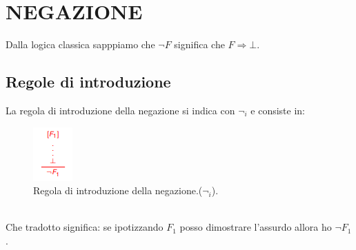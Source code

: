 \documentclass[12pt]{article}
\begin{document}
\section{NEGAZIONE}
\label{sec:neg}
Dalla logica classica sapppiamo che $ \neg F $ significa che $F \Rightarrow \bot $.

\pagebreak
\subsection{Regole di introduzione}
\label{ssec:neg_intro}
La regola di introduzione della negazione si indica con $\neg_i$ e consiste in:
\begin{figure}[!htb]
    \centering
    \includegraphics[width=.9\linewidth,height=.2\textheight,keepaspectratio]{logica_proposizionale/introduzione/introduzione_not.png} %
    \begin{center}
        \caption{\label{fig:introduzione_neg}Regola di introduzione della negazione.($\neg_i$).} %
    \end{center}
\end{figure}
\\
Che tradotto significa: se ipotizzando $F_1$ posso dimostrare l'assurdo allora ho $\neg F_1$.
\end{document}

